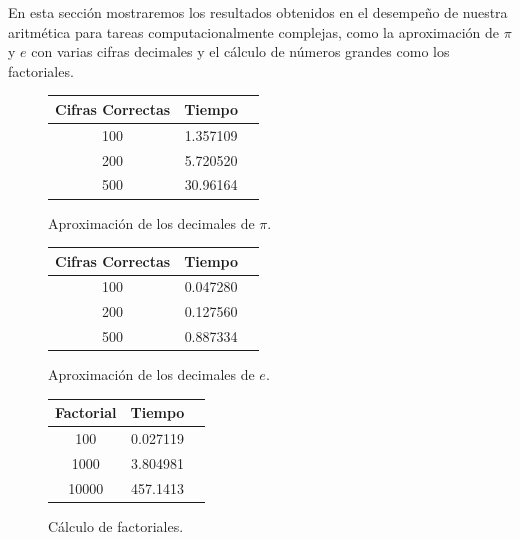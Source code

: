 \documentclass[a4paper,10pt,twocolumn]{article}
\begin{document}
En esta sección mostraremos los resultados obtenidos en el desempeño de nuestra aritmética para tareas computacionalmente complejas, como la aproximación de $\pi$ y $e$ con varias cifras decimales y el cálculo de números grandes como los factoriales.

\begin{figure}[h!]%
	\begin{center}
		\begin{tabular}{|c|c|c|} \hline
			Cifras Correctas & Tiempo   \\ \hline
			100              & 1.357109 \\ \hline  
			200              & 5.720520 \\ \hline
			500              & 30.96164 \\ \hline
			
		\end{tabular}
		\caption{Aproximación de los decimales de $\pi$. \label{fig:ex}}
	\end{center}
\end{figure}

\begin{figure}[h!]%
	\begin{center}
		\begin{tabular}{|c|c|c|} \hline
			Cifras Correctas & Tiempo   \\ \hline
			100              & 0.047280 \\ \hline  
			200              & 0.127560 \\ \hline
			500              & 0.887334 \\ \hline
			
		\end{tabular}
		\caption{Aproximación de los decimales de $e$. \label{fig:ex}}
	\end{center}
\end{figure}

\begin{figure}[h!]%
	\begin{center}
		\begin{tabular}{|c|c|c|} \hline
			Factorial & Tiempo   \\ \hline
			100       & 0.027119 \\ \hline  
			1000      & 3.804981 \\ \hline
			10000     & 457.1413 \\ \hline
			
		\end{tabular}
		\caption{Cálculo de factoriales. \label{fig:ex}}
	\end{center}
\end{figure}
\end{document}
